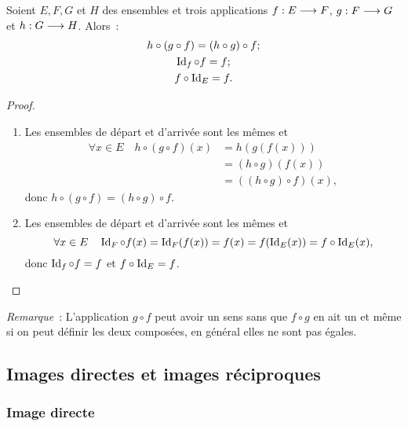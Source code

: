 \begin{prop}
  Soient \(E, F, G\) et \(H\) des ensembles et trois applications
  \(f:E \longrightarrow{} F\), \(g:F \longrightarrow{} G\) et \(h:G \longrightarrow{} H\).
  Alors~:
  \begin{gather}
    h \circ (g \circ f) = (h \circ g) \circ f;\\
    \operatorname{Id}_f \circ f = f;\\
    f \circ \operatorname{Id}_E = f.
  \end{gather}
\end{prop}

\begin{proof}
  \begin{enumerate}
    \item Les ensembles de départ et d'arrivée sont les mêmes et
      \begin{align*}
        \forall{}x \in{}E \quad h \circ (g \circ f)(x) & = h(g(f(x))) \\
                                                     & = (h \circ g)(f(x))\\
                                                     & = ((h \circ g) \circ f)(x),
      \end{align*}
      donc \(h \circ (g \circ f) = (h \circ g) \circ f\).
    \item Les ensembles de départ et d'arrivée sont les mêmes et
      \begin{equation*}
        \forall{}x \in{}E \quad \operatorname{Id}_F \circ
        f(x) = \operatorname{Id}_F(f(x)) = f(x) = f(\operatorname{Id}_E(x)) = f \circ \operatorname{Id}_E(x),
      \end{equation*}
      donc \(\operatorname{Id}_f \circ f = f\) et \(f \circ \operatorname{Id}_E = f\).
  \end{enumerate}
\end{proof}

\emph{Remarque}~: L'application \(g \circ f\) peut avoir un sens sans que \(f
\circ g\) en ait un et même si on peut définir les deux composées, en général
elles ne sont pas égales.

\subsection{Images directes et images réciproques}\label{chap3-subsec:imagesdirecteetrec}

\subsubsection{Image directe}\label{chap3-subsec:imagedirecte}

